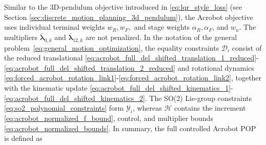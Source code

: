 Similar to the 3D-pendulum objective introduced in \eqref{eq:lqr_style_loss}
(see Section \ref{sec:discrete_motion_planning_3d_pendulum}), the Acrobot
objective uses individual terminal weights $w_R,w_F,$ and stage weights 
$\alpha_R,\alpha_F$, and \(w_u\). The multipliers $\bar{\bm{\lambda}}_{0,k}$ and $\bar{\bm{\lambda}}_{12,k}$ 
are not penalized. In the notation of the general problem~\eqref{eq:general_motion_optimization}, 
the equality constraints $\mathcal{D}_i$ consist of the reduced translational 
\eqref{eq:acrobot_full_del_shifted_translation_1_reduced}-\eqref{eq:acrobot_full_del_shifted_translation_2_reduced} 
and rotational dynamics \eqref{eq:forced_acrobot_rotation_link1}-\eqref{eq:forced_acrobot_rotation_link2},
together with the kinematic update 
\eqref{eq:acrobot_full_del_shifted_kinematics_1}-\eqref{eq:acrobot_full_del_shifted_kinematics_2}. 
The SO(2) Lie-group constraints \eqref{eq:so2_polynomial_constraints}
form $\mathcal{Y}_i$, whereas $\mathcal{H}$ contains the increment \eqref{eq:acrobot_normalized_f_bound},
control, and multiplier bounds \eqref{eq:acrobot_normalized_bounds}.
In summary, the
full controlled Acrobot POP is defined as
\begingroup
\footnotesize
\allowdisplaybreaks
